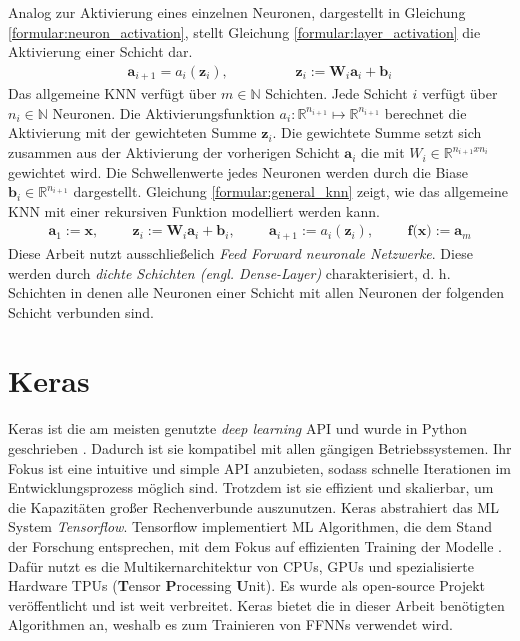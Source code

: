 Analog zur Aktivierung eines einzelnen Neuronen, dargestellt in Gleichung \ref{formular:neuron_activation}, stellt Gleichung \ref{formular:layer_activation} die Aktivierung einer Schicht dar.
\begin{align}
    \label{formular:layer_activation}
    \textbf{a}_{i+1} = a_i(\textbf{z}_i), \hspace{2cm} \textbf{z}_i := \textbf{W}_i\textbf{a}_i + \textbf{b}_i
\end{align}
Das allgemeine KNN verfügt über $m\in\mathbb{N}$ Schichten. Jede Schicht $i$ verfügt über $n_i\in\mathbb{N}$ Neuronen.
Die Aktivierungsfunktion $a_i:\mathbb{R}^{n_{i+1}}\mapsto\mathbb{R}^{n_{i+1}}$ berechnet die Aktivierung mit der gewichteten Summe $\textbf{z}_i$.
Die gewichtete Summe setzt sich zusammen aus der Aktivierung der vorherigen Schicht $\textbf{a}_i$ die mit $W_i\in\mathbb{R}^{n_{i+1}x{n_{i}}}$ gewichtet wird.
Die Schwellenwerte jedes Neuronen werden durch die Biase $\textbf{b}_i\in\mathbb{R}^{n_{i+1}}$ dargestellt.
Gleichung \ref{formular:general_knn} zeigt, wie das allgemeine KNN mit einer rekursiven Funktion modelliert werden kann.
\begin{align}
    \label{formular:general_knn}
    \textbf{a}_1 := \textbf{x}, \hspace{1cm} \textbf{z}_i := \textbf{W}_i\textbf{a}_i + \textbf{b}_i, \hspace{1cm} \textbf{a}_{i+1} := a_i(\textbf{z}_i), \hspace{1cm} \textbf{f(x)} := \textbf{a}_m
\end{align}
Diese Arbeit nutzt ausschließelich \textit{Feed Forward neuronale Netzwerke}.
Diese werden durch \textit{dichte Schichten (engl. Dense-Layer)} charakterisiert, d. h. Schichten in denen alle Neuronen einer Schicht mit allen Neuronen der folgenden Schicht verbunden sind.

\section{Keras}
Keras ist die am meisten genutzte \textit{deep learning} API und wurde in Python geschrieben \cite{kerasDoc}.
Dadurch ist sie kompatibel mit allen gängigen Betriebssystemen.
Ihr Fokus ist eine intuitive und simple API anzubieten, sodass schnelle Iterationen im Entwicklungsprozess möglich sind.
Trotzdem ist sie effizient und skalierbar, um die Kapazitäten großer Rechenverbunde auszunutzen.
\newline
\newline
Keras abstrahiert das ML System \textit{Tensorflow}. Tensorflow implementiert ML Algorithmen, die dem Stand der Forschung entsprechen, mit dem Fokus
auf effizienten Training der Modelle \cite{abadi2016tensorflow}.
Dafür nutzt es die Multikernarchitektur von CPUs, GPUs und spezialisierte Hardware TPUs (\textbf{T}ensor \textbf{P}rocessing \textbf{U}nit).
Es wurde als open-source Projekt veröffentlicht und ist weit verbreitet.
\newline
\newline
Keras bietet die in dieser Arbeit benötigten Algorithmen an, weshalb es zum Trainieren von FFNNs verwendet wird.

